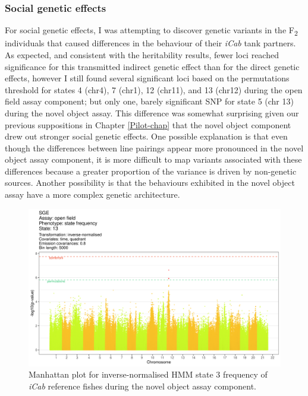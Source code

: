 \documentclass[
]{book}
\begin{document}
\hypertarget{social-genetic-effects-2}{%
\subsubsection{Social genetic effects}\label{social-genetic-effects-2}}

For social genetic effects, I was attempting to discover genetic variants in the F\textsubscript{2} individuals that caused differences in the behaviour of their \emph{\textcolor{iCab_424B4D}{iCab}} tank partners. As expected, and consistent with the heritability results, fewer loci reached significance for this transmitted indirect genetic effect than for the direct genetic effects, however I still found several significant loci based on the permutations threshold for states 4 (chr4), 7 (chr1), 12 (chr11), and 13 (chr12) during the open field assay component; but only one, barely significant SNP for state 5 (chr 13) during the novel object assay. This difference was somewhat surprising given our previous suppositions in Chapter \ref{Pilot-chap} that the novel object component drew out stronger social genetic effects. One possible explanation is that even though the differences between line pairings appear more pronounced in the novel object assay component, it is more difficult to map variants associated with these differences because a greater proportion of the variance is driven by non-genetic sources. Another possibility is that the behaviours exhibited in the novel object assay have a more complex genetic architecture.



\begin{figure}
\includegraphics[width=1\linewidth]{figs/mikk_behaviour/manhattans/sge_of_13_time-quadrant} \caption{Manhattan plot for inverse-normalised HMM state 3 frequency of \emph{\textcolor{iCab_424B4D}{iCab}} reference fishes during the novel object assay component.}\label{fig:F2-man-sge-of-13}
\end{figure}
\end{document}
